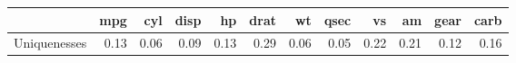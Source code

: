 \begin{tabular}{rrrrrrrrrrrr}
  \hline
 & mpg & cyl & disp & hp & drat & wt & qsec & vs & am & gear & carb \\ 
  \hline
Uniquenesses & 0.13 & 0.06 & 0.09 & 0.13 & 0.29 & 0.06 & 0.05 & 0.22 & 0.21 & 0.12 & 0.16 \\ 
   \hline
\end{tabular}
